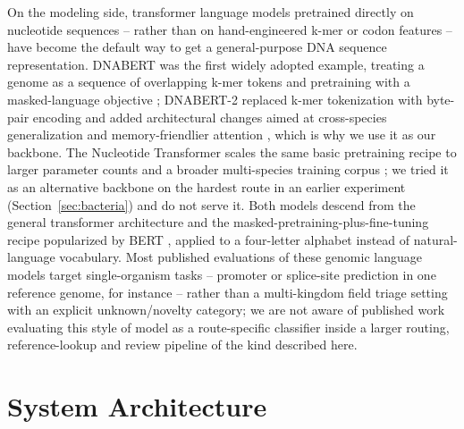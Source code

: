 \documentclass[conference]{IEEEtran}
\begin{document}
On the modeling side, transformer language models pretrained directly on nucleotide sequences -- rather than on hand-engineered k-mer or codon features -- have become the default way to get a general-purpose DNA sequence representation. DNABERT was the first widely adopted example, treating a genome as a sequence of overlapping k-mer tokens and pretraining with a masked-language objective \cite{ji2021dnabert}; DNABERT-2 replaced k-mer tokenization with byte-pair encoding and added architectural changes aimed at cross-species generalization and memory-friendlier attention \cite{zhou2023dnabert2}, which is why we use it as our backbone. The Nucleotide Transformer scales the same basic pretraining recipe to larger parameter counts and a broader multi-species training corpus \cite{dallatorre2023nucleotide}; we tried it as an alternative backbone on the hardest route in an earlier experiment (Section~\ref{sec:bacteria}) and do not serve it. Both models descend from the general transformer architecture \cite{vaswani2017attention} and the masked-pretraining-plus-fine-tuning recipe popularized by BERT \cite{devlin2019bert}, applied to a four-letter alphabet instead of natural-language vocabulary. Most published evaluations of these genomic language models target single-organism tasks -- promoter or splice-site prediction in one reference genome, for instance -- rather than a multi-kingdom field triage setting with an explicit unknown/novelty category; we are not aware of published work evaluating this style of model as a route-specific classifier inside a larger routing, reference-lookup and review pipeline of the kind described here.

\section{System Architecture}
\end{document}
